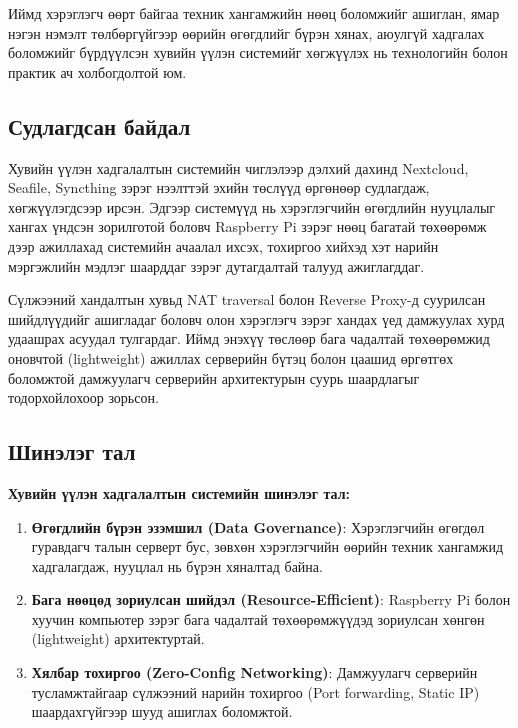         Иймд хэрэглэгч өөрт байгаа техник хангамжийн нөөц боломжийг ашиглан, ямар нэгэн нэмэлт төлбөргүйгээр өөрийн өгөгдлийг бүрэн хянах, аюулгүй хадгалах боломжийг бүрдүүлсэн хувийн үүлэн системийг хөгжүүлэх нь технологийн болон практик ач холбогдолтой юм.

    \subsection*{Судлагдсан байдал}
        Хувийн үүлэн хадгалалтын системийн чиглэлээр дэлхий дахинд Nextcloud, Seafile, Syncthing зэрэг нээлттэй эхийн төслүүд өргөнөөр судлагдаж, хөгжүүлэгдсээр ирсэн. Эдгээр системүүд нь хэрэглэгчийн өгөгдлийн нууцлалыг хангах үндсэн зорилготой боловч Raspberry Pi зэрэг нөөц багатай төхөөрөмж дээр ажиллахад системийн ачаалал ихсэх, тохиргоо хийхэд хэт нарийн мэргэжлийн мэдлэг шаарддаг зэрэг дутагдалтай талууд ажиглагддаг.

        Сүлжээний хандалтын хувьд NAT traversal болон Reverse Proxy-д суурилсан шийдлүүдийг ашигладаг боловч олон хэрэглэгч зэрэг хандах үед дамжуулах хурд удаашрах асуудал тулгардаг. Иймд энэхүү төслөөр бага чадалтай төхөөрөмжид оновчтой (lightweight) ажиллах серверийн бүтэц болон цаашид өргөтгөх боломжтой дамжуулагч серверийн архитектурын суурь шаардлагыг тодорхойлохоор зорьсон.
        
   \subsection*{Шинэлэг тал}
    \textbf{Хувийн үүлэн хадгалалтын системийн шинэлэг тал:} 
        \begin{enumerate}[itemsep=0mm]
            \item \textbf{Өгөгдлийн бүрэн эзэмшил (Data Governance)}: Хэрэглэгчийн өгөгдөл гуравдагч талын серверт бус, зөвхөн хэрэглэгчийн өөрийн техник хангамжид хадгалагдаж, нууцлал нь бүрэн хяналтад байна.
            \item \textbf{Бага нөөцөд зориулсан шийдэл (Resource-Efficient)}: Raspberry Pi болон хуучин компьютер зэрэг бага чадалтай төхөөрөмжүүдэд зориулсан хөнгөн (lightweight) архитектуртай.
            \item \textbf{Хялбар тохиргоо (Zero-Config Networking)}: Дамжуулагч серверийн тусламжтайгаар сүлжээний нарийн тохиргоо (Port forwarding, Static IP) шаардахгүйгээр шууд ашиглах боломжтой.
        \end{enumerate}

